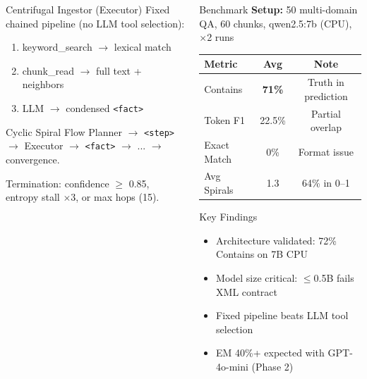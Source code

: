 \documentclass[final]{beamer}
\newlength{\sep}\setlength{\sep}{24pt}
\newlength{\colwidth}\setlength{\colwidth}{0.28\textwidth}
\begin{document}
\begin{frame}[t]
\begin{columns}[t]
\begin{column}{\colwidth}
\vspace{\sep}

\begin{block}{Centrifugal Ingestor (Executor)}
Fixed chained pipeline (no LLM tool selection):
\begin{enumerate}
    \item keyword\_search $\rightarrow$ lexical match
    \item chunk\_read $\rightarrow$ full text + neighbors
    \item LLM $\rightarrow$ condensed \texttt{<fact>}
\end{enumerate}
\end{block}

\vspace{\sep}

\begin{block}{Cyclic Spiral Flow}
Planner $\rightarrow$ \texttt{<step>} $\rightarrow$ Executor $\rightarrow$ \texttt{<fact>} $\rightarrow$ ... $\rightarrow$ convergence.

\vspace{4pt}
Termination: confidence $\ge$ 0.85, entropy stall $\times$3, or max hops (15).
\end{block}
\end{column}

\begin{column}{\colwidth}
\begin{block}{Benchmark}
\textbf{Setup:} 50 multi-domain QA, 60 chunks, qwen2.5:7b (CPU), $\times$2 runs
\vspace{8pt}
\begin{center}
\begin{tabular}{lcc}
\toprule
Metric & Avg & Note \\
\midrule
Contains & \textbf{71\%} & Truth in prediction \\
Token F1 & 22.5\% & Partial overlap \\
Exact Match & 0\% & Format issue \\
Avg Spirals & 1.3 & 64\% in 0--1 \\
\bottomrule
\end{tabular}
\end{center}
\end{block}

\vspace{\sep}

\begin{block}{Key Findings}
\begin{itemize}
    \item Architecture validated: 72\% Contains on 7B CPU
    \item Model size critical: $\le$0.5B fails XML contract
    \item Fixed pipeline beats LLM tool selection
    \item EM 40\%+ expected with GPT-4o-mini (Phase 2)
\end{itemize}
\end{block}


\end{column}
\end{columns}
\end{frame}
\end{document}
